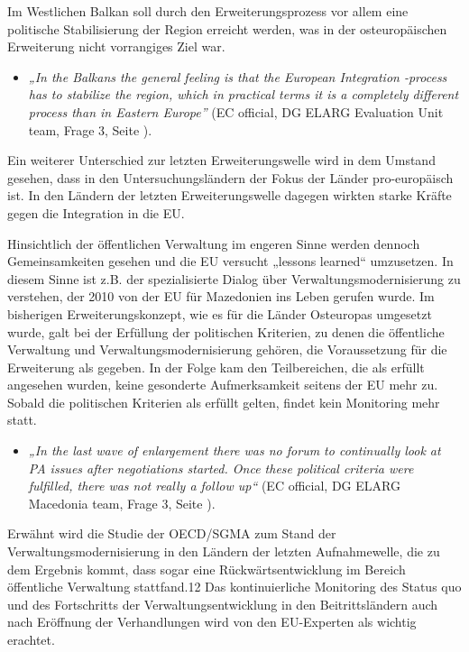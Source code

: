 Im Westlichen Balkan soll durch den Erweiterungsprozess vor allem eine politische Stabilisierung der Region erreicht werden, was in der osteuropäischen Erweiterung nicht vorrangiges Ziel war. 
\begin{itemize}[label={}]
\item \textit{„In the Balkans the general feeling is that the European Integration -process has to stabilize the region, which in practical terms it is a completely different process than in Eastern Europe”} (EC official, DG ELARG Evaluation Unit team, Frage 3, Seite \pageref{sec:enlargement}).
\end{itemize}
Ein weiterer Unterschied zur letzten Erweiterungswelle wird in dem Umstand gesehen, dass in den Untersuchungsländern der Fokus der Länder pro-europäisch ist. In den Ländern der letzten Erweiterungswelle dagegen wirkten starke Kräfte gegen die Integration in die EU.\par
Hinsichtlich der öffentlichen Verwaltung im engeren Sinne werden dennoch Gemeinsamkeiten gesehen und die EU versucht „lessons learned“ umzusetzen. In diesem Sinne ist z.B. der spezialisierte Dialog über Verwaltungsmodernisierung zu verstehen, der 2010 von der EU für Mazedonien ins Leben gerufen wurde. Im bisherigen Erweiterungskonzept, wie es für die Länder Osteuropas umgesetzt wurde, galt bei der Erfüllung der politischen Kriterien, zu denen die öffentliche Verwaltung und Verwaltungsmodernisierung gehören, die Voraussetzung für die Erweiterung als gegeben. In der Folge kam den Teilbereichen, die als erfüllt angesehen wurden, keine gesonderte Aufmerksamkeit seitens der EU mehr zu. Sobald die politischen Kriterien als erfüllt gelten, findet kein Monitoring mehr statt.
\begin{itemize}[label={}]
\item \textit{„In the last wave of enlargement there was no forum to continually look at PA issues after negotiations started. Once these political criteria were fulfilled, there was not really a follow up“} (EC official, DG ELARG Macedonia team, Frage 3, Seite \pageref{sec:enlargement}).
\end{itemize}
Erwähnt wird die Studie der OECD/SGMA zum Stand der Verwaltungsmodernisierung in den Ländern der letzten Aufnahmewelle, die zu dem Ergebnis kommt, dass sogar eine Rückwärtsentwicklung im Bereich öffentliche Verwaltung stattfand.12 Das kontinuierliche Monitoring des Status quo und des Fortschritts der Verwaltungsentwicklung in den Beitrittsländern auch nach Eröffnung der Verhandlungen wird von den EU-Experten als wichtig erachtet.\par
